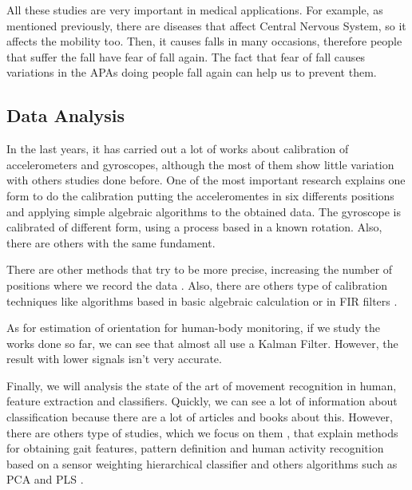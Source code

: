 All these studies are very important in medical applications. For example, as mentioned previously, there are diseases that affect Central Nervous System, so it affects  the mobility too. Then, it causes falls in many occasions, therefore  people that suffer the fall have fear of fall again. The fact that fear of fall causes variations in the APAs doing people  fall again can help us to prevent them.

\subsection{Data Analysis}

In the last years, it has carried out a lot of works about  calibration of accelerometers and gyroscopes, although the most of them show little variation with others studies done before. One of the most important research  \cite{Kian2011}explains one form to do the calibration putting the acceleromentes in six differents positions and applying  simple algebraic algorithms to the obtained data. The gyroscope is calibrated of different form, using a process based in a known rotation. Also, there are others with the same fundament.

There are other methods that try to be more precise, increasing the number of positions where we record the data \cite{Camps2009}. Also, there are others type of calibration techniques like algorithms based in basic algebraic calculation or in FIR filters \cite{A.Olivares2013}.

As for estimation of orientation for human-body monitoring, if we study the works done so far, we can see that almost all  use a Kalman Filter. However, the result with lower signals isn’t very accurate\cite{A.Olivares2013}.

Finally, we will analysis the state of the art of movement recognition in human, feature extraction and classifiers. Quickly, we can see a lot of information about classification because there are a lot of articles and books about this. However, there are others type of studies, which we focus on  them \cite{FrenkelToledo} \cite{Jeon}\cite{Banos2012}, that explain methods for obtaining gait features, pattern definition and human activity recognition based on a sensor weighting hierarchical classifier and others algorithms such as PCA and PLS \cite{Gorriz} \cite{pls_pca}. 
